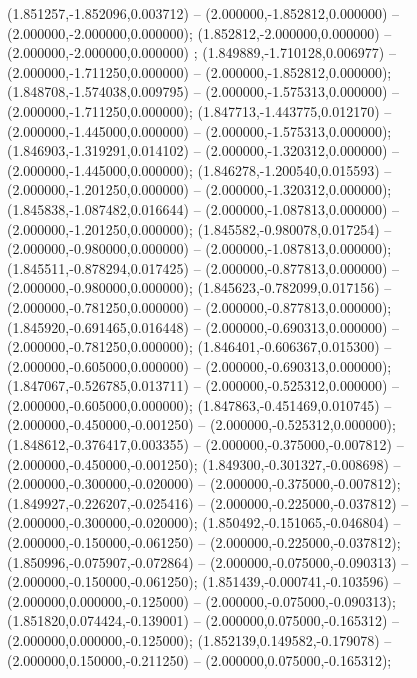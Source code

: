  (1.851257,-1.852096,0.003712) -- (2.000000,-1.852812,0.000000) -- (2.000000,-2.000000,0.000000);
 (1.852812,-2.000000,0.000000) -- (2.000000,-2.000000,0.000000) ;
 (1.849889,-1.710128,0.006977) -- (2.000000,-1.711250,0.000000) -- (2.000000,-1.852812,0.000000);
 (1.848708,-1.574038,0.009795) -- (2.000000,-1.575313,0.000000) -- (2.000000,-1.711250,0.000000);
 (1.847713,-1.443775,0.012170) -- (2.000000,-1.445000,0.000000) -- (2.000000,-1.575313,0.000000);
 (1.846903,-1.319291,0.014102) -- (2.000000,-1.320312,0.000000) -- (2.000000,-1.445000,0.000000);
 (1.846278,-1.200540,0.015593) -- (2.000000,-1.201250,0.000000) -- (2.000000,-1.320312,0.000000);
 (1.845838,-1.087482,0.016644) -- (2.000000,-1.087813,0.000000) -- (2.000000,-1.201250,0.000000);
 (1.845582,-0.980078,0.017254) -- (2.000000,-0.980000,0.000000) -- (2.000000,-1.087813,0.000000);
 (1.845511,-0.878294,0.017425) -- (2.000000,-0.877813,0.000000) -- (2.000000,-0.980000,0.000000);
 (1.845623,-0.782099,0.017156) -- (2.000000,-0.781250,0.000000) -- (2.000000,-0.877813,0.000000);
 (1.845920,-0.691465,0.016448) -- (2.000000,-0.690313,0.000000) -- (2.000000,-0.781250,0.000000);
 (1.846401,-0.606367,0.015300) -- (2.000000,-0.605000,0.000000) -- (2.000000,-0.690313,0.000000);
 (1.847067,-0.526785,0.013711) -- (2.000000,-0.525312,0.000000) -- (2.000000,-0.605000,0.000000);
 (1.847863,-0.451469,0.010745) -- (2.000000,-0.450000,-0.001250) -- (2.000000,-0.525312,0.000000);
 (1.848612,-0.376417,0.003355) -- (2.000000,-0.375000,-0.007812) -- (2.000000,-0.450000,-0.001250);
 (1.849300,-0.301327,-0.008698) -- (2.000000,-0.300000,-0.020000) -- (2.000000,-0.375000,-0.007812);
 (1.849927,-0.226207,-0.025416) -- (2.000000,-0.225000,-0.037812) -- (2.000000,-0.300000,-0.020000);
 (1.850492,-0.151065,-0.046804) -- (2.000000,-0.150000,-0.061250) -- (2.000000,-0.225000,-0.037812);
 (1.850996,-0.075907,-0.072864) -- (2.000000,-0.075000,-0.090313) -- (2.000000,-0.150000,-0.061250);
 (1.851439,-0.000741,-0.103596) -- (2.000000,0.000000,-0.125000) -- (2.000000,-0.075000,-0.090313);
 (1.851820,0.074424,-0.139001) -- (2.000000,0.075000,-0.165312) -- (2.000000,0.000000,-0.125000);
 (1.852139,0.149582,-0.179078) -- (2.000000,0.150000,-0.211250) -- (2.000000,0.075000,-0.165312);
